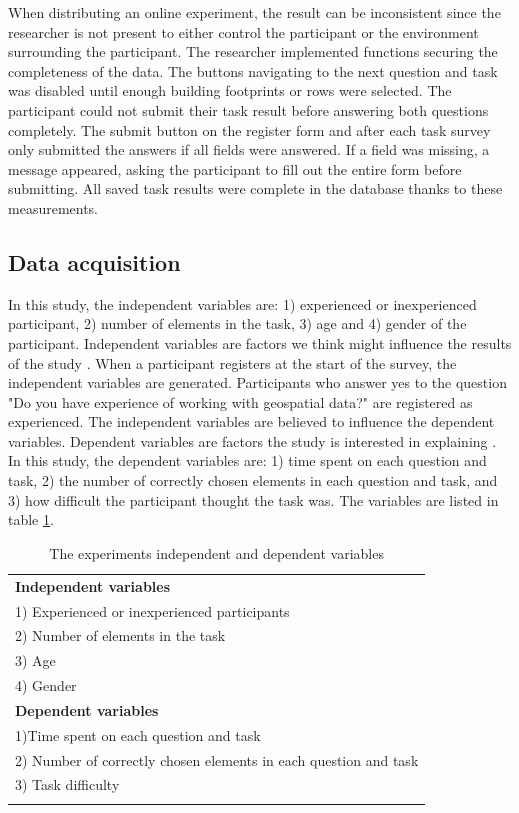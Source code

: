 When distributing an online experiment, the result can be inconsistent since the researcher is not present to either control the participant or the environment surrounding the participant. The researcher implemented functions securing the completeness of the data. The buttons navigating to the next question and task was disabled until enough building footprints or rows were selected. The participant could not submit their task result before answering both questions completely. The submit button on the register form and after each task survey only submitted the answers if all fields were answered. If a field was missing, a message appeared, asking the participant to fill out the entire form before submitting. All saved task results were complete in the database thanks to these measurements.

\subsection{Data acquisition}
In this study, the independent variables are: 1) experienced or inexperienced participant, 2) number of elements in the task, 3) age and 4) gender of the participant.  Independent variables are factors we think might influence the results of the study \citep[p.~49]{Kitchin2000}. When a participant registers at the start of the survey, the independent variables are generated. Participants who answer yes to the question "Do you have experience of working with geospatial data?" are registered as experienced. The independent variables are believed to influence the dependent variables. Dependent variables are factors the study is interested in explaining \citep[p.~49]{Kitchin2000}. In this study, the dependent variables are: 1) time spent on each question and task, 2) the number of correctly chosen elements in each question and task, and 3) how difficult the participant thought the task was. The variables are listed in table \ref{tab:independentdependentvariables}.

\begin{longtable}{|l|}
	\hline \textbf{Independent variables}  \\
	1) Experienced or inexperienced participants   \\
	2) Number of elements in the task   \\
	3) Age   \\ 
	4) Gender  \\ \hline
	\textbf{Dependent variables}   \\ 
	1)Time spent on each question and task \\
	2) Number of correctly chosen elements in each question and task \\ 
	3) Task difficulty  \\  \hline
	\caption[Experiments variables]{The experiments independent and dependent variables} \label{tab:independentdependentvariables} \\
\end{longtable}

